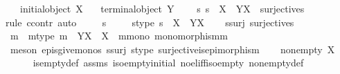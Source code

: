 \begin{isabellebody}
\ \ \ {\isachardoublequoteopen}{\isasymnot}{\isacharparenleft}{\kern0pt}initial{\isacharunderscore}{\kern0pt}object\ X{\isacharparenright}{\kern0pt}{\isachardoublequoteclose}\isanewline
\ \ \ {\isachardoublequoteopen}{\isasymnot}{\isacharparenleft}{\kern0pt}terminal{\isacharunderscore}{\kern0pt}object\ Y{\isacharparenright}{\kern0pt}{\isachardoublequoteclose}\isanewline
\ \ \ {\isachardoublequoteopen}{\isasymnexists}\ s{\isachardot}{\kern0pt}\ s\ {\isacharcolon}{\kern0pt}\ X\ {\isasymrightarrow}\ Y\isactrlbsup X\isactrlesup \ {\isasymand}\ surjective{\isacharparenleft}{\kern0pt}s{\isacharparenright}{\kern0pt}{\isachardoublequoteclose}\isanewline
%
\isadelimproof
%
\endisadelimproof
%
\isatagproof
{}\isamarkupfalse%
{\isacharparenleft}{\kern0pt}rule\ ccontr{\isacharcomma}{\kern0pt}\ auto{\isacharparenright}{\kern0pt}\ \isanewline
\ \ \isamarkupfalse%
\ s\ \isanewline
\ \ \isamarkupfalse%
\ s{\isacharunderscore}{\kern0pt}type{\isacharcolon}{\kern0pt}\ {\isachardoublequoteopen}s\ {\isacharcolon}{\kern0pt}\ X\ {\isasymrightarrow}\ Y\isactrlbsup X\isactrlesup {\isachardoublequoteclose}\isanewline
\ \ \isamarkupfalse%
\ s{\isacharunderscore}{\kern0pt}surj{\isacharcolon}{\kern0pt}\ {\isachardoublequoteopen}surjective{\isacharparenleft}{\kern0pt}s{\isacharparenright}{\kern0pt}{\isachardoublequoteclose}\isanewline
\ \ \isamarkupfalse%
\ m\ \ m{\isacharunderscore}{\kern0pt}type{\isacharcolon}{\kern0pt}\ {\isachardoublequoteopen}m\ {\isacharcolon}{\kern0pt}\ Y\isactrlbsup X\isactrlesup \ {\isasymrightarrow}\ X{\isachardoublequoteclose}\ \ m{\isacharunderscore}{\kern0pt}mono{\isacharcolon}{\kern0pt}\ {\isachardoublequoteopen}monomorphism{\isacharparenleft}{\kern0pt}m{\isacharparenright}{\kern0pt}{\isachardoublequoteclose}\isanewline
\ \ \ \ \isamarkupfalse%
\ {\isacharparenleft}{\kern0pt}meson\ epis{\isacharunderscore}{\kern0pt}give{\isacharunderscore}{\kern0pt}monos\ s{\isacharunderscore}{\kern0pt}surj\ s{\isacharunderscore}{\kern0pt}type\ surjective{\isacharunderscore}{\kern0pt}is{\isacharunderscore}{\kern0pt}epimorphism{\isacharparenright}{\kern0pt}\isanewline
\ \ \isamarkupfalse%
\ {\isachardoublequoteopen}nonempty\ X{\isachardoublequoteclose}\isanewline
\ \ \ \ \isamarkupfalse%
\ is{\isacharunderscore}{\kern0pt}empty{\isacharunderscore}{\kern0pt}def\ assms{\isacharparenleft}{\kern0pt}{}{\isacharparenright}{\kern0pt}\ iso{\isacharunderscore}{\kern0pt}empty{\isacharunderscore}{\kern0pt}initial\ no{\isacharunderscore}{\kern0pt}el{\isacharunderscore}{\kern0pt}iff{\isacharunderscore}{\kern0pt}iso{\isacharunderscore}{\kern0pt}empty\ nonempty{\isacharunderscore}{\kern0pt}def\ \isamarkupfalse%

\end{isabellebody}
